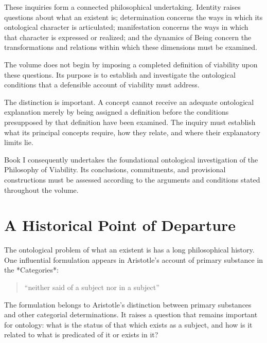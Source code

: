 These inquiries form a connected philosophical
undertaking. Identity raises questions about what
an existent is; determination concerns the ways
in which its ontological character is articulated;
manifestation concerns the ways in which that
character is expressed or realized; and the dynamics
of Being concern the transformations and relations
within which these dimensions must be examined.

The volume does not begin by imposing a completed
definition of viability upon these questions.
Its purpose is to establish and investigate the
ontological conditions that a defensible account
of viability must address.

The distinction is important. A concept cannot
receive an adequate ontological explanation merely
by being assigned a definition before the conditions
presupposed by that definition have been examined.
The inquiry must establish what its principal
concepts require, how they relate, and where their
explanatory limits lie.

Book I consequently undertakes the foundational
ontological investigation of the Philosophy of
Viability. Its conclusions, commitments, and
provisional constructions must be assessed according
to the arguments and conditions stated throughout
the volume.



\section*{A Historical Point of Departure}

The ontological problem of what an existent is
has a long philosophical history. One influential
formulation appears in Aristotle's account of
primary substance in the *Categories*:

\begin{quote}
\enquote{neither said of a subject nor in a subject}
\cite[Cat. 5, 2a11--14]{AristotleCategories}
\end{quote}

The formulation belongs to Aristotle's distinction
between primary substances and other categorial
determinations. It raises a question that remains
important for ontology: what is the status of that
which exists as a subject, and how is it related
to what is predicated of it or exists in it?

